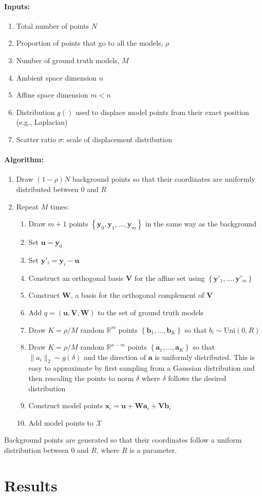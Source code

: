 \documentclass[a4page,11pt]{article}
\renewcommand{\vec}[1]{\mathbf{#1}}%
\newcommand{\mat}[1]{\mathbf{#1}}%
\newcommand{\set}[1]{\mathcal{#1}}%
\newcommand{\setdef}[1]{\left\{#1\right\}}%
\def\reals{\mathbb{R}}%
\begin{document}
\paragraph{Inputs:} 
\begin{enumerate}
\item Total number of points $N$
\item Proportion of points that go to all the models, $\rho$
\item Number of ground truth models, $M$
\item Ambient space dimension $n$
\item Affine space dimension $m < n$
\item Distribution $g()$ used to displace model points from their exact position (e.g., Laplacian)
\item Scatter ratio $\sigma$: scale of displacement distribution
\end{enumerate}

\paragraph{Algorithm:}
\begin{enumerate}
\item Draw $(1-\rho)N$ background points so that their coordinates are uniformly distributed between $0$ and $R$
\item Repeat $M$ times:
  \begin{enumerate}
  \item Draw $m+1$ points $\setdef{\vec{y}_0,\vec{y}_1,\ldots,\vec{y}_m}$ in the same way as the background
  \item Set $\vec{u} = \vec{y}_0$
  \item Set $\vec{y}'_i = \vec{y}_i - \vec{u}$
  \item Construct an orthogonal basis $\mat{V}$ for the affine set using 
$\setdef{\vec{y}'_1,\ldots,\vec{y}'_m}$
  \item Construct $\mat{W}$, a basis for the orthogonal complement of $\mat{V}$
  \item Add $q=(\vec{u},\mat{V},\mat{W})$ to the set of ground truth models
  \item Draw $K=\rho/M$ random $\reals^m$ points $\setdef{\vec{b}_1,\ldots,\vec{b}_{K}}$  so that $b_i \sim \mathrm{Uni}(0,R)$
  \item Draw $K=\rho/M$ random $\reals^{n-m}$ points $\setdef{\vec{a}_1,\ldots,\vec{a}_{K}}$  so that $\|a_i\|_2 \sim g(\delta)$ and the direction of $\vec{a}$ is uniformly distributed. This is easy to approximate by first sampling from a Gaussian distribution and then rescaling the points to norm $\delta$ where $\delta$ follows the desired distribution
  \item Construct model points $\vec{x}_i = \vec{u} + \mat{W}\vec{a}_i + \mat{V}\vec{b}_i$
  \item Add model points to $\set{X}$
  \end{enumerate}
\end{enumerate}

Background points are generated so that their coordinates follow a uniform distribution between $0$ and $R$, where $R$ is a parameter.


\section{Results}
\end{document}
